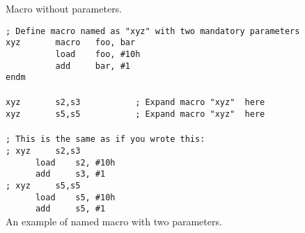            Macro without parameters.

        {
            \usecodefont
            \verb'; Define macro named as "xyz" with two mandatory parameters'\\
            \verb'xyz       macro   foo, bar'\\
            \verb'          load    foo, #10h'\\
            \verb'          add     bar, #1'\\
            \verb'endm'\\\\
            \verb'xyz       s2,s3           ; Expand macro "xyz"  here'\\
            \verb'xyz       s5,s5           ; Expand macro "xyz"  here'\\\\
            \verb'; This is the same as if you wrote this:'\\
            \verb'; xyz     s2,s3'\\
            \verb'      load    s2, #10h'\\
            \verb'      add     s3, #1'\\
            \verb'; xyz     s5,s5'\\
            \verb'      load    s5, #10h'\\
            \verb'      add     s5, #1'\\
        }
        An example of named macro with two parameters.

